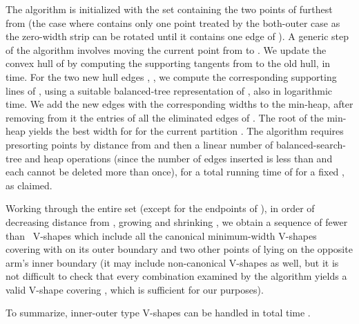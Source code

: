 \documentclass{llncs}
\begin{document}
The algorithm is initialized with the set  containing the two points of  furthest from  (the case where  contains 
only one point treated by the both-outer case as the zero-width strip  can be rotated until it 
contains one edge of ).  A generic step of the
algorithm involves moving the current point  from  to .  We
update the convex hull of  by computing the supporting tangents
from  to the old hull, in  time.  For the two new hull
edges , , we compute the corresponding supporting lines
 of , using a suitable balanced-tree
representation of , also in logarithmic time.  We add the new
edges with the corresponding widths to the min-heap, after removing
from it the entries of all the eliminated edges of .  The
root of the min-heap yields the best width for  for the current
partition .
The algorithm requires presorting points by distance from  and
then a linear number of balanced-search-tree and heap operations
(since the number of edges inserted is less than  and each cannot
be deleted more than once), for a total running time of 
for a fixed , as claimed.

Working through the entire set  (except for the endpoints of ), in
order of decreasing distance from , growing  and shrinking
, we obtain a sequence of fewer than~ V-shapes which include
all the canonical minimum-width V-shapes covering  with  on its
outer boundary and two other points of  lying on the opposite arm's
inner boundary (it may include non-canonical V-shapes as well, but it
is not difficult to check  
that every combination  examined
by the algorithm yields a valid V-shape covering , which is
sufficient for our purposes). 


To summarize, inner-outer type V-shapes can be handled in total
time .
\end{document}
